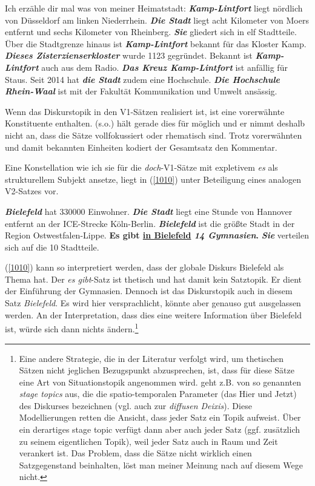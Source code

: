 {\begin{exe}
	\ex\label{1009} 
	\scriptsize
	Ich erzähle dir mal was von meiner Heimatstadt: \textbf{\textit{Kamp-Lintfort}} liegt nördlich von Düsseldorf am linken Niederrhein. 						\textbf{\textit{Die Stadt}} liegt acht Kilometer von Moers entfernt und sechs Kilometer von Rheinberg. \textbf{\textit{Sie}} gliedert sich in elf 			Stadtteile. Über die Stadtgrenze hinaus ist \textbf{\textit{Kamp-Lintfort}} bekannt für das Kloster Kamp. \textbf{\textit{Dieses Zisterzienserkloster}} 	wurde 1123 gegründet. Bekannt ist \textbf{\textit{Kamp-Lintfort}} auch aus dem Radio. \textbf{\textit{Das Kreuz Kamp-Lintfort}} ist anfällig für 			Staus. Seit 2014 hat \textbf{\textit{die Stadt}} zudem eine Hochschule. \textbf{\textit{Die Hochschule Rhein-Waal}} ist mit der Fakultät \glqq 				Kommunikation und Umwelt\grqq{} ansässig.
\end{exe}
Wenn das Diskurstopik in den V1-Sätzen realisiert ist, ist eine vorerwähnte Konstituente enthalten. \citet{Oennerfors1997} (s.o.) hält gerade dies für möglich und er nimmt deshalb nicht an, dass die Sätze vollfokussiert oder rhematisch sind. Trotz vorerwähnten und damit bekannten Einheiten kodiert der Gesamtsatz den Kommentar. 

Eine Konstellation wie ich sie für die \textit{doch}-V1-Sätze mit expletivem \textit{es} als strukturellem Subjekt ansetze, liegt in (\ref{1010}) unter Beteiligung eines analogen V2-Satzes vor.

\begin{exe}
	\ex\label{1010} 
	\scriptsize
	\textbf{\textit{Bielefeld}} hat 330000 Einwohner. \textbf{\textit{Die Stadt}} liegt eine Stunde von Hannover entfernt an der ICE-Strecke Köln-Berlin. 		\textbf{\textit{Bielefeld}} ist die größte Stadt in der Region Ostwestfalen-Lippe. \textbf{Es gibt \underline{in Bielefeld} \textit{14 Gymnasien}.} 		\textbf{\textit{Sie}} verteilen sich auf die 10 Stadtteile.
\end{exe}	
(\ref{1010}) kann so interpretiert werden, dass der globale Diskurs Bielefeld als Thema hat. Der \textit{es gibt}-Satz ist thetisch  und hat damit kein  Satztopik. Er dient der Einführung der Gymnasien. Dennoch ist das Diskurstopik auch in diesem Satz \textit{Bielefeld}. Es wird hier versprachlicht, könnte aber genauso gut ausgelassen werden. An der Interpretation, dass dies eine weitere Information über Bielefeld ist, würde sich dann nichts ändern.\footnote{Eine andere Strategie, die in der Literatur verfolgt wird, um thetischen Sätzen nicht jeglichen Bezugspunkt abzusprechen, ist, dass für diese Sätze eine Art von Situationstopik angenommen wird. \citet[16]{Erteschik-Shir2007} geht z.B. von so genannten \textit{stage topics} aus, die die spatio-temporalen Parameter (das Hier und Jetzt) des Diskurses bezeichnen (vgl. auch \citealt{Back1995} zur \textit{diffusen Deixis}). Diese Modellierungen \glqq retten\grqq{} die Ansicht, dass jeder Satz ein Topik aufweist. Über ein derartiges stage topic verfügt dann aber auch jeder Satz (ggf. zusätzlich zu seinem \glq eigentlichen\grq{} Topik), weil jeder Satz auch in Raum und Zeit verankert ist. Das Problem, dass die Sätze nicht wirklich einen Satzgegenstand beinhalten, löst man meiner Meinung nach auf diesem Wege nicht.}

}
